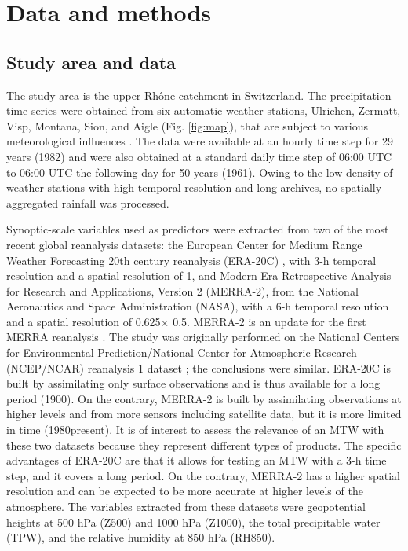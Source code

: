 \documentclass[hess, manuscript]{copernicus}
\providecommand{\DIFadd}[1]{{\protect\color{blue}\uwave{#1}}} %
\providecommand{\DIFaddbegin}{} %
\providecommand{\DIFaddend}{} %
\begin{document}
	
	\section{Data and methods}
	\label{sec:data_methods}

	\subsection{Study area and data}
	\label{sec:data}

	The study area is the upper Rh\^{o}ne catchment in Switzerland. The precipitation time series were obtained from six automatic weather stations, Ulrichen, Zermatt, Visp, Montana, Sion, and Aigle (Fig. \ref{fig:map}), that are subject to various meteorological influences \citep{Horton2012}. The data were available at an hourly time step for 29 years (1982) and were also obtained at a standard daily time step of 06:00 \DIFaddbegin \DIFadd{h }\DIFaddend UTC to 06:00 \DIFaddbegin \DIFadd{h }\DIFaddend UTC the following day for 50 years (1961). Owing to the low density of weather stations with high temporal resolution and long archives, no spatially aggregated rainfall was processed.

	Synoptic-scale variables used as predictors were extracted from two of the most recent global reanalysis datasets: the European Center for Medium Range Weather Forecasting 20th century reanalysis (ERA-20C) \citep{Poli2016}, with 3-h temporal resolution and a spatial resolution of 1\textdegree, and Modern-Era Retrospective Analysis for Research and Applications, Version 2 (MERRA-2), from the National Aeronautics and Space Administration (NASA), with a 6-h temporal resolution and a spatial resolution of 0.625\textdegree × 0.5\textdegree. MERRA-2 is an update for the first MERRA reanalysis \citep{Rienecker2011}. The study was originally performed on the National Centers for Environmental Prediction/National Center for Atmospheric Research (NCEP/NCAR) reanalysis 1 dataset \citep{Kalnay1996}; the conclusions were similar. ERA-20C is built by assimilating only surface observations and is thus available for a long period (1900). On the contrary, MERRA-2 is built by assimilating observations at higher levels and from more sensors including satellite data, but it is more limited in time (1980\textendash present). It is of interest to assess the relevance of an MTW with these two datasets because they represent different types of products. The specific advantages of ERA-20C are that it allows for testing an MTW with a 3-h time step, and it covers a long period. On the contrary, MERRA-2 has a higher spatial resolution and can be expected to be more accurate at higher levels of the atmosphere. The variables extracted from these datasets were geopotential heights at 500 hPa (Z500) and 1000 hPa (Z1000), the total precipitable water (TPW), and the relative humidity at 850 hPa (RH850).
\end{document}
